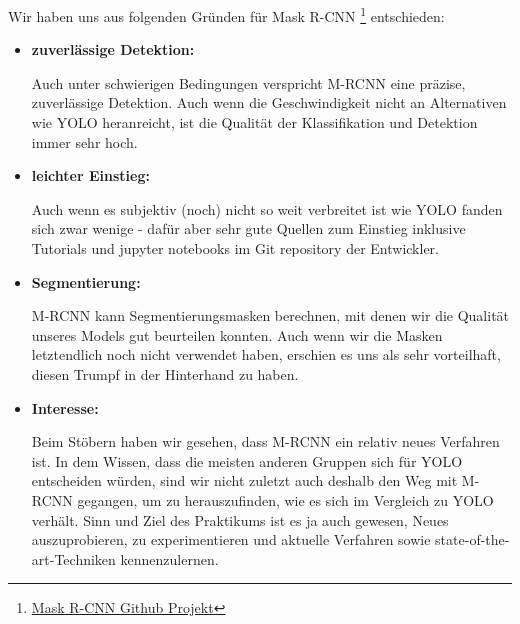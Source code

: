 Wir haben uns aus folgenden Gründen für Mask R-CNN \footnote{\href{https://github.com/matterport/Mask_RCNN}{Mask R-CNN Github Projekt}} entschieden:
\begin{itemize}
	\item \textbf{zuverlässige Detektion:}

Auch unter schwierigen Bedingungen verspricht M-RCNN eine präzise, zuverlässige Detektion. Auch wenn die Geschwindigkeit nicht an Alternativen wie YOLO heranreicht, ist die Qualität der Klassifikation und Detektion immer sehr hoch.
	\item \textbf{leichter Einstieg:}

Auch wenn es subjektiv (noch) nicht so weit verbreitet ist wie YOLO fanden sich zwar wenige - dafür aber sehr gute Quellen zum Einstieg inklusive Tutorials und jupyter notebooks im Git repository der Entwickler.
	\item \textbf{Segmentierung:}

M-RCNN kann Segmentierungsmasken berechnen, mit denen wir die Qualität unseres Models gut beurteilen konnten.
Auch wenn wir die Masken letztendlich noch nicht verwendet haben, erschien es uns als sehr vorteilhaft, diesen Trumpf in der Hinterhand zu haben.
	\item \textbf{Interesse:}

Beim Stöbern haben wir gesehen, dass M-RCNN ein relativ neues Verfahren ist.
In dem Wissen, dass die meisten anderen Gruppen sich für YOLO entscheiden würden, sind wir nicht zuletzt auch deshalb den Weg mit M-RCNN gegangen, um zu herauszufinden, wie es sich im Vergleich zu YOLO verhält. Sinn und Ziel des Praktikums ist es ja auch gewesen, Neues auszuprobieren, zu experimentieren und aktuelle Verfahren sowie state-of-the-art-Techniken kennenzulernen.

\end{itemize}
